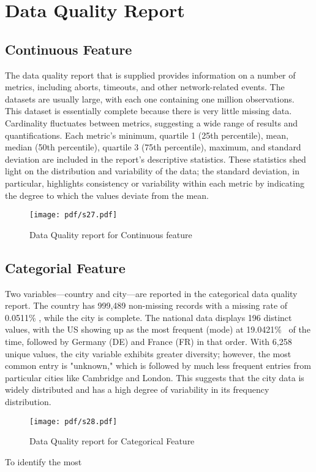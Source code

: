 \section{Data Quality Report}
\subsection {Continuous Feature}
The data quality report that is supplied provides information on a number of metrics, including aborts, timeouts, and other network-related events. The datasets are usually large, with each one containing one million observations. This dataset is essentially complete because there is very little missing data. Cardinality fluctuates between metrics, suggesting a wide range of results and quantifications. Each metric's minimum, quartile 1 (25th percentile), mean, median (50th percentile), quartile 3 (75th percentile), maximum, and standard deviation are included in the report's descriptive statistics. These statistics shed light on the distribution and variability of the data; the standard deviation, in particular, highlights consistency or variability within each metric by indicating the degree to which the values deviate from the mean.
\begin{figure}[ht!]
  \raggedright
  \texttt{[image: pdf/s27.pdf]}
  \vspace{-10pt}
  \caption
  {Data Quality report for Continuous feature }
\end{figure}
\subsection {Categorial Feature}
Two variables—country and city—are reported in the categorical data quality report. The country has 999,489 non-missing records with a missing rate of 0.0511\% , while the city is complete. The national data displays 196 distinct values, with the US showing up as the most frequent (mode) at 19.0421\% \ of the time, followed by Germany (DE) and France (FR) in that order. With 6,258 unique values, the city variable exhibits greater diversity; however, the most common entry is "unknown," which is followed by much less frequent entries from particular cities like Cambridge and London. This suggests that the city data is widely distributed and has a high degree of variability in its frequency distribution.
\begin{figure}[ht!]
  \raggedright
\texttt{[image: pdf/s28.pdf]}
  \vspace{-10pt}
  \caption{Data Quality report for Categorical Feature}
\end{figure}
To identify the most

